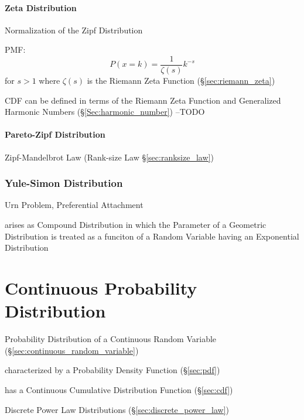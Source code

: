 \paragraph{Zeta Distribution}\label{sec:zeta_distribution}\hfill

Normalization of the Zipf Distribution

PMF:
\[
  P(x = k) = \frac{1}{\zeta(s)} k^{-s}
\]
for $s > 1$ where $\zeta(s)$ is the Riemann Zeta Function
(\S\ref{sec:riemann_zeta})

CDF can be defined in terms of the Riemann Zeta Function and Generalized
Harmonic Numbers (\S\ref{Sec:harmonic_number}) --TODO



\paragraph{Pareto-Zipf Distribution}\label{sec:pareto_zipf}\hfill

Zipf-Mandelbrot Law (Rank-size Law \S\ref{sec:ranksize_law})



\subsubsection{Yule-Simon Distribution}\label{sec:yule_simon_distribution}

Urn Problem, Preferential Attachment

arises as Compound Distribution in which the Parameter of a Geometric
Distribution is treated as a funciton of a Random Variable having an Exponential
Distribution



\section{Continuous Probability Distribution}\label{sec:continuous_probability}

Probability Distribution of a Continuous Random Variable
(\S\ref{sec:continuous_random_variable})

characterized by a Probability Density Function (\S\ref{sec:pdf})

has a Continuous Cumulative Distribution Function (\S\ref{sec:cdf})

\fist Discrete Power Law Distributions
(\S\ref{sec:discrete_power_law})

